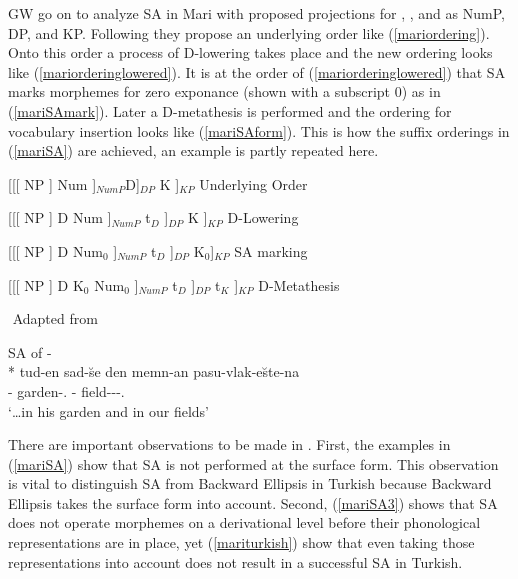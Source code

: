 GW go on to analyze SA in Mari with proposed projections for {\Poss}, {\Pl}, and {\Case} as NumP, DP, and KP. Following \cite{merchant2015ineffable} they propose an underlying order like (\ref{mariordering}). Onto this order a process of D-lowering takes place and the new ordering looks like (\ref{mariorderinglowered}). It is at the order of (\ref{mariorderinglowered}) that SA marks morphemes for zero exponance (shown with a subscript 0) as in (\ref{mariSAmark}). Later a D-metathesis is performed and the ordering for vocabulary insertion looks like (\ref{mariSAform}). This is how the suffix orderings in (\ref{mariSA}) are achieved, an example is partly repeated here.
\begin{exe}
    \ex \begin{xlist}
    \ex \label{mariordering}
    [[[ NP ] Num ]$_{NumP}$D]$_{DP}$ K ]$_{KP}$ \hfill Underlying Order
    
     \ex \label{mariorderinglowered}
    [[[ NP ] D Num ]$_{NumP}$ t$_D$ ]$_{DP}$ K ]$_{KP}$ \hfill D-Lowering
    
    \ex \label{mariSAmark}
    [[[ NP ] D Num$_0$ ]$_{NumP}$ t$_D$ ]$_{DP}$ K$_0$]$_{KP}$ \hfill SA marking
    
    \ex \label{mariSAform}
    [[[ NP ] D K$_0$ Num$_0$ ]$_{NumP}$ t$_D$ ]$_{DP}$ t$_K$ ]$_{KP}$ \hfill D-Metathesis
    \end{xlist}
     ${}$ \hfill Adapted from \cite{guseva2017postsyntactic}

     SA of {\Pl-\Iness}\\*
    \gll tud-en sad-\u{s}e den memn-an pasu-vlak-e\u{s}te-na \\ 
    {\Tsg}-{\Gen} garden-{\Poss}.{\Tsg} {\And} {\Fpl}-{\Gen} field-{\Pl}-{\Iness}-{\Poss}.{\Fpl}\\ 
    \glt `\ldots in his garden and in our fields'
\end{exe}

There are important observations to be made in \cite{guseva2017postsyntactic}. First, the examples in (\ref{mariSA}) show that SA is not performed at the surface form. This observation is vital to distinguish SA from Backward Ellipsis in Turkish because Backward Ellipsis takes the surface form into account. Second, (\ref{mariSA3}) shows that SA does not operate morphemes on a derivational level before their phonological representations are in place, yet (\ref{mariturkish}) show that even taking those representations into account does not result in a successful SA in Turkish. 
